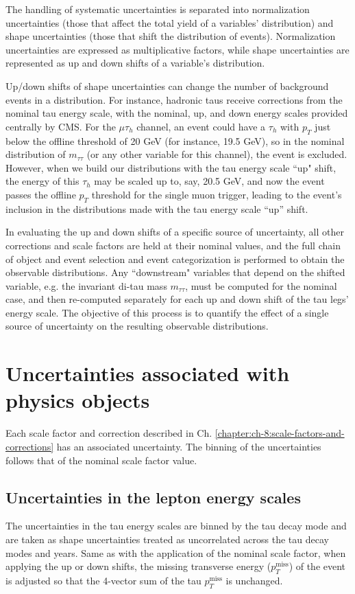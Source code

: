 The handling of systematic uncertainties is separated into normalization uncertainties (those that affect the total yield of a variables' distribution) and shape uncertainties (those that shift the distribution of events). Normalization uncertainties are expressed as multiplicative factors, while shape uncertainties are represented as up and down shifts of a variable's distribution.

Up/down shifts of shape uncertainties can change the number of background events in a distribution. For instance, hadronic taus receive corrections from the nominal tau energy scale, with the nominal, up, and down energy scales provided centrally by CMS. For the $\mu\tau_{h}$ channel, an event could have a $\tau_{h}$ with $p_{T}$ just below the offline threshold of 20 GeV (for instance, 19.5 GeV), so in the nominal distribution of $m_{\tau\tau}$ (or any other variable for this channel), the event is excluded. However, when we build our distributions with the tau energy scale ``up" shift, the energy of this $\tau_{h}$ may be scaled up to, say, 20.5 GeV, and now the event passes the offline $p_{T}$ threshold for the single muon trigger, leading to the event's inclusion in the distributions made with the tau energy scale ``up'' shift.

In evaluating the up and down shifts of a specific source of uncertainty, all other corrections and scale factors are held at their nominal values, and the full chain of object and event selection and event categorization is performed to obtain the observable distributions. Any ``downstream" variables that depend on the shifted variable, e.g. the invariant di-tau mass $m_{\tau\tau}$, must be computed for the nominal case, and then re-computed separately for each up and down shift of the tau legs' energy scale.  The objective of this process is to quantify the effect of a single source of uncertainty on the resulting observable distributions. 


\section{Uncertainties associated with physics objects}
Each scale factor and correction described in Ch. \ref{chapter:ch-8:scale-factors-and-corrections} has an associated uncertainty. The binning of the uncertainties follows that of the nominal scale factor value.

\subsection{Uncertainties in the lepton energy scales}
The uncertainties in the tau energy scales \cite{twiki_TAU_POG_tauidrecommendationforrun2} are binned by the tau decay mode and are taken as shape uncertainties treated as uncorrelated across the tau decay modes and years. Same as with the application of the nominal scale factor, when applying the up or down shifts, the missing transverse energy ($p_{T}^{\text{miss}}$) of the event is adjusted so that the 4-vector sum of the tau $p_{T}^{\text{miss}}$ is unchanged.

